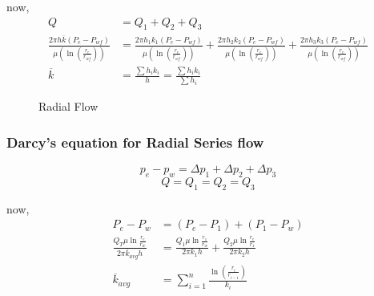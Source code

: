 \documentclass{article}
\begin{document}
    now,
    \begin{align*}
        Q &= Q_1 + Q_2 + Q_3 \\
        \frac{2\pi h \overline{k} \left(P_e - P_{wf}\right)}{\mu \left(\ln \left(\frac{r_e}{r_{wf}}\right)\right)}  &= \frac{2\pi h_1 k_1 \left(P_e - P_{wf}\right)}{\mu \left(\ln \left(\frac{r_e}{r_{wf}}\right)\right)} + \frac{2\pi h_2 k_2 \left(P_e - P_{wf}\right)}{\mu \left(\ln \left(\frac{r_e}{r_{wf}}\right)\right)} + \frac{2\pi h_3 k_3 \left(P_e - P_{wf}\right)}{\mu \left(\ln \left(\frac{r_e}{r_{wf}}\right)\right)} \\ 
        \overline{k} &= \frac{\sum h_ik_i}{h} =\frac{\sum h_ik_i}{\sum h_i}
    \end{align*}

    \begin{figure}[h]
        \centering
      
        \hfill
    
        \caption{Radial Flow}
        \label{fig:Radial flow}
      \end{figure}

    \subsubsection*{Darcy’s equation for Radial Series flow }
    $$p_e - p_w = \Delta p_1 + \Delta p_2 + \Delta p_3$$
    $$Q = Q_1 = Q_2 = Q_3 $$

now,
\begin{align*}
    P_e - P_w &= (P_e-P_1)+(P_1-P_w) \\ 
    \frac{Q_T \mu \ln \frac{r_e}{r_w}}{2\pi \overline{k}_{avg} h} &= \frac{Q_1 \mu \ln \frac{r_1}{r_w}}{2\pi k_1 h} + \frac{Q_2 \mu \ln \frac{r_e}{r_1}}{2\pi k_2 h} \\
    \overline{k}_{avg} &= \sum_{i=1}^{n} \frac{\ln \left(\frac{r_i}{r_{i-1}}\right)}{k_i}
\end{align*}
\end{document}
